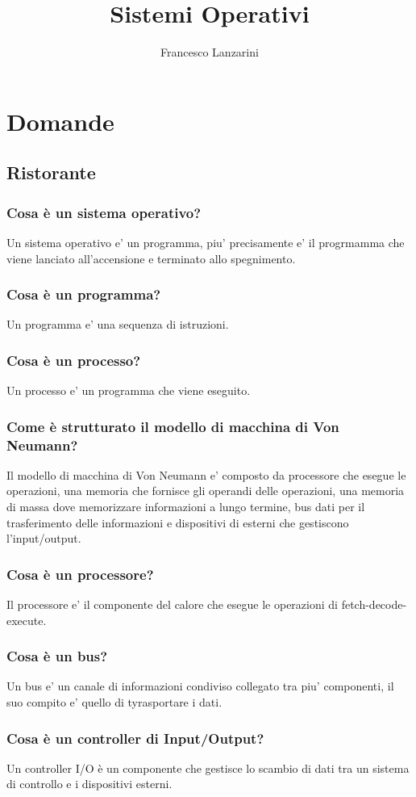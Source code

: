 \documentclass{article}
\title{Sistemi Operativi}
\author{Francesco Lanzarini}
\date{ }
\begin{document}
\maketitle

\section{Domande}
\subsection{Ristorante}
\subsubsection{Cosa è un sistema operativo?}
Un sistema operativo e' un programma, piu' precisamente e' il progrmamma che
viene lanciato all'accensione e terminato allo spegnimento.
\subsubsection{Cosa è un programma?}
Un programma e' una sequenza di istruzioni.
\subsubsection{Cosa è un processo?}
Un processo e' un programma che viene eseguito.
\subsubsection{Come è strutturato il modello di macchina di Von Neumann?}
Il modello di macchina di Von Neumann e' composto da processore che esegue le
operazioni, una memoria che fornisce gli operandi delle operazioni, una memoria
di massa dove memorizzare informazioni a lungo termine, bus dati per il
trasferimento delle informazioni e dispositivi di esterni che gestiscono
l'input/output.
\subsubsection{Cosa è un processore?}
Il processore e' il componente del calore che esegue le operazioni di
fetch-decode-execute.
\subsubsection{Cosa è un bus?}
Un bus e' un canale di informazioni condiviso collegato tra piu' componenti, il
suo compito e' quello di tyrasportare i dati.
\subsubsection{Cosa è un controller di Input/Output?}
Un controller I/O è un componente che gestisce lo scambio di dati tra un
sistema di controllo e i dispositivi esterni.
\end{document}

